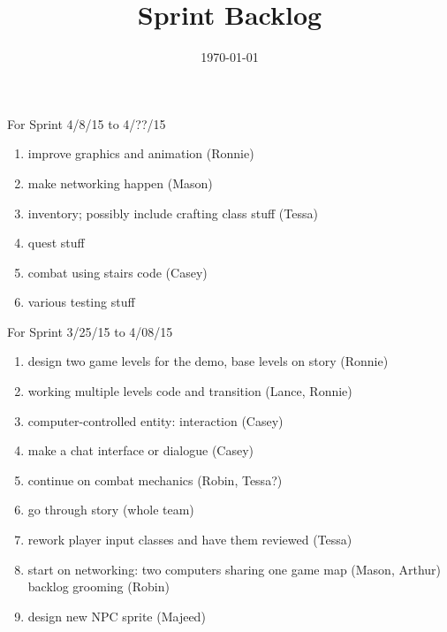 \documentclass[12pt]{article}
\title{Sprint Backlog}
\date{\today}
\begin{document}
\maketitle



\begin{section}{For Sprint 4/8/15 to 4/??/15}
\begin{enumerate}


\item improve graphics and animation (Ronnie)
\item make networking happen (Mason) 
\item inventory; possibly include crafting class stuff (Tessa) 
\item quest stuff
\item combat using stairs code (Casey)
\item various testing stuff


\end{enumerate}
\end{section}



\begin{section}{For Sprint 3/25/15 to 4/08/15}
\begin{enumerate}
\item design two game levels for the demo, base levels on story (Ronnie)
\item working multiple levels code and transition (Lance, Ronnie)
\item computer-controlled entity: interaction (Casey)
\item make a chat interface or dialogue (Casey)
\item continue on combat mechanics (Robin, Tessa?)
\item go through story (whole team)
\item rework player input classes and have them reviewed (Tessa) 
\item start on networking: two computers sharing one game map (Mason, Arthur)
\itm backlog grooming (Robin)
\item design new NPC sprite (Majeed)
\end{enumerate}
\end{section}
\end{document}
